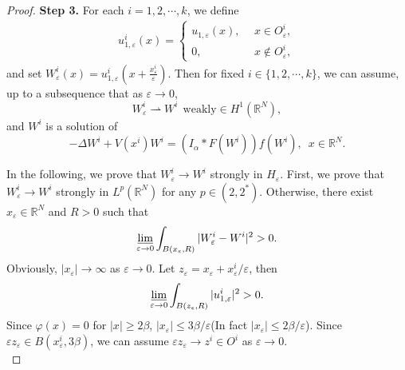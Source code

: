 \documentclass[12pt,reqno]{amsart}
\numberwithin{equation}{section}
\begin{document}
\begin{proof}
{\bf Step 3.} For each $i=1,2,\cdots, k$, we define
\begin{eqnarray}\label{4sec43}
u_{1,{\varepsilon}}^i(x)=\left\{
                  \begin{array}{ll}
                    u_{1,{\varepsilon}}(x), \ \ &x\in O_{\varepsilon}^i,\\
                    0, \ \ &x\notin O_{\varepsilon}^i,
                  \end{array}
                \right.
\end{eqnarray}
and set
$W_{\varepsilon}^i(x)=u_{1,{\varepsilon}}^i\left(x+\frac{x_{\varepsilon}^i}{\varepsilon}\right)$.
Then for fixed $i\in \{1,2,\cdots,k\}$, we can assume, up to a
subsequence that as ${\varepsilon}{\rightarrow}0$,
$$W_{\varepsilon}^i\rightharpoonup W^i\ \ \text{weakly} \in H^1({\mathbb R^N}),$$
and $W^i$ is a solution of
\begin{equation*}
-\Delta W^i+V(x^i)W^i=(I_{\alpha}\ast F(W^i))f(W^i),\,\,\,x\in{\mathbb R^N}.
\end{equation*}

In the following, we prove that $W_{\varepsilon}^i\rightarrow W^i$ strongly in $H_{\varepsilon}$. First, we prove that $W_{\varepsilon}^i\rightarrow W^i$ strongly in $L^p({\mathbb R^N})$ for any $p\in(2,2^\ast)$. Otherwise, there exist $x_{\varepsilon}\in{\mathbb R^N}$ and $R>0$ such that
$$
\varliminf\limits_{{\varepsilon}\rightarrow 0}\int_{B(x_{\varepsilon},R)}|W_{\varepsilon}^i- W^i|^2>0.
$$
Obviously, $|x_{\varepsilon}|{\rightarrow}{\infty}$ as ${\varepsilon}{\rightarrow}0$. Let $z_{\varepsilon}=x_{\varepsilon}+x_{\varepsilon}^i/{\varepsilon}$, then
\begin{equation}\label{4sec44}
\varliminf\limits_{{\varepsilon}\rightarrow 0}\int_{B(z_{\varepsilon},R)}|u_{1,{\varepsilon}}^i|^2>0.
\end{equation}
Since ${\varphi}(x)=0$ for $|x|\ge2\beta$, $|x_{\varepsilon}|\le3\beta/{\varepsilon}$(In fact $|x_{\varepsilon}|\le2\beta/{\varepsilon}$). Since ${\varepsilon} z_{\varepsilon}\in B(x_{\varepsilon}^i, 3\beta)$, we can
assume ${\varepsilon} z_{\varepsilon}\rightarrow z^i\in O^i$ as
${\varepsilon}\rightarrow 0$.\\


\end{proof}
\end{document}
